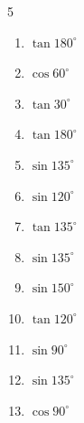 \begin{multicols}{5}
\begin{enumerate}
        \phantom{$\displaystyle =-1$}

  \item $\displaystyle \tan{180^\circ}$

        \phantom{$\displaystyle =0$}

  \item $\displaystyle \cos{60^\circ}$


  \item $\displaystyle \tan{30^\circ}$


  \item $\displaystyle \tan{180^\circ}$

        \phantom{$\displaystyle =0$}

  \item $\displaystyle \sin{135^\circ}$


  \item $\displaystyle \sin{120^\circ}$


  \item $\displaystyle \tan{135^\circ}$

        \phantom{$\displaystyle =-1$}

  \item $\displaystyle \sin{135^\circ}$


  \item $\displaystyle \sin{150^\circ}$


  \item $\displaystyle \tan{120^\circ}$


  \item $\displaystyle \sin{90^\circ}$

        \phantom{$\displaystyle =1$}

  \item $\displaystyle \sin{135^\circ}$


  \item $\displaystyle \cos{90^\circ}$


\end{enumerate}
\end{multicols}
